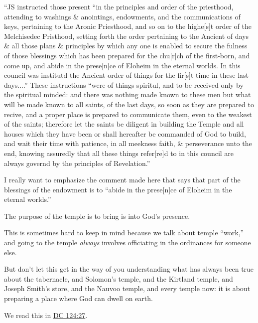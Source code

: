\begin{compactitem}
\begin{compactitem}
\begin{compactitem}
							\item ``JS instructed those present “in the principles and order of the priesthood, attending to washings \& anointings, endowments, and the communications of keys, pertaining to the Aronic Priesthood, and so on to the highe[s]t order of the Melchisedec Pristhood, setting forth the order pertaining to the Ancient of days \& all those plans \& principles by which any one is enabled to secure the fulness of those blessings which has been prepared for the chu[r]ch of the first-born, and come up, and abide in the prese[n]ce of Eloheim in the eternal worlds. In this council was institutd the Ancient order of things for the fir[s]t time in these last days....'' These instructions ``were of things spiritul, and to be received only by the spiritual minded: and there was nothing made known to these men but what will be made known to all saints, of the last days, so soon as they are prepared to recive, and a proper place is prepared to communicate them, even to the weakest of the saints; therefore let the saints be diligent in building the Temple and all houses which they have been or shall hereafter be commanded of God to build, and wait their time with patience, in all meekness faith, \& perseverance unto the end, knowing assuredly that all these things refer[re]d to in this council are always governd by the principles of Revelation.''
						\end{compactitem}
					\item I really want to emphasize the comment made here that says that part of the blessings of the endowment is to ``abide in the prese[n]ce of Eloheim in the eternal worlds.''
					\item The purpose of the temple is to bring is into God's presence.
						\begin{compactitem}
							\item This is sometimes hard to keep in mind because we talk about temple ``work,'' and going to the temple \textit{always} involves officiating in the ordinances for someone else.
							\item But don't let this get in the way of you understanding what has always been true about the tabernacle, and Solomon's temple, and the Kirtland temple, and Joseph Smith's store, and the Nauvoo temple, and every temple now: it is about preparing a place where God can dwell on earth.
							\item We read this in \hyperref[DC124-27]{DC 124:27}.
						\end{compactitem}
				\end{compactitem}
				

\end{compactitem}
